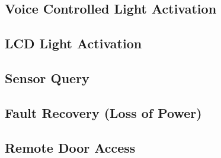 
\subsection{Voice Controlled Light Activation}

\subsection{LCD Light Activation}

\subsection{Sensor Query}

\subsection{Fault Recovery (Loss of Power)}

\subsection{Remote Door Access}
\label{sec:demo-door}

